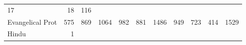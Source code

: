 \documentclass[]{article}
\begin{document}
\begin{longtable}[]{@{}lrrrrrrrrrr@{}}
\begin{minipage}[t]{0.06\columnwidth}
17\strut
\end{minipage} & \begin{minipage}[t]{0.04\columnwidth}\raggedleft\strut
18\strut
\end{minipage} & \begin{minipage}[t]{0.11\columnwidth}\raggedleft\strut
116\strut
\end{minipage}\tabularnewline
\begin{minipage}[t]{0.14\columnwidth}\raggedright\strut
Evangelical Prot\strut
\end{minipage} & \begin{minipage}[t]{0.04\columnwidth}\raggedleft\strut
575\strut
\end{minipage} & \begin{minipage}[t]{0.05\columnwidth}\raggedleft\strut
869\strut
\end{minipage} & \begin{minipage}[t]{0.05\columnwidth}\raggedleft\strut
1064\strut
\end{minipage} & \begin{minipage}[t]{0.05\columnwidth}\raggedleft\strut
982\strut
\end{minipage} & \begin{minipage}[t]{0.05\columnwidth}\raggedleft\strut
881\strut
\end{minipage} & \begin{minipage}[t]{0.05\columnwidth}\raggedleft\strut
1486\strut
\end{minipage} & \begin{minipage}[t]{0.06\columnwidth}\raggedleft\strut
949\strut
\end{minipage} & \begin{minipage}[t]{0.06\columnwidth}\raggedleft\strut
723\strut
\end{minipage} & \begin{minipage}[t]{0.04\columnwidth}\raggedleft\strut
414\strut
\end{minipage} & \begin{minipage}[t]{0.11\columnwidth}\raggedleft\strut
1529\strut
\end{minipage}\tabularnewline
\begin{minipage}[t]{0.14\columnwidth}\raggedright\strut
Hindu\strut
\end{minipage} & \begin{minipage}[t]{0.04\columnwidth}\raggedleft\strut
1\strut
\end{minipage} & \begin{minipage}[t]{0.05\columnwidth}\raggedleft\strut

\end{minipage}
\end{longtable}
\end{document}
